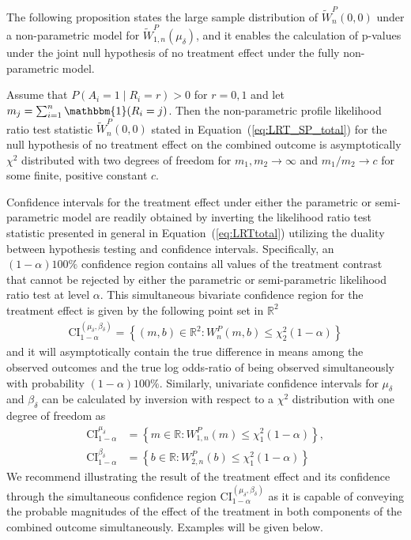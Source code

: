 The following proposition states the large sample distribution of $\widetilde{W}_n^P(0, 0)$ under a non-parametric model for $\widetilde{W}_{1,n}^P(\mu_\delta)$, and it enables the calculation of p-values under the joint null hypothesis of no treatment effect under the fully non-parametric model.

\begin{proposition}
Assume that $P(A_i = 1 \mid R_i = r) > 0$ for $r = 0, 1$ and let $m_j = \sum_{i = 1}^n \mathbbm{1}(R_i = j)$. Then the non-parametric profile likelihood ratio test statistic $\widetilde{W}_n^P(0,0)$ stated in Equation~(\ref{eq:LRT_SP_total}) for the null hypothesis of no treatment effect on the combined outcome is asymptotically $\chi^2$ distributed with two degrees of freedom for $m_1, m_2 \rightarrow \infty$ and $m_1 / m_2 \rightarrow c$ for some finite, positive constant $c$.
\end{proposition}

Confidence intervals for the treatment effect under either the parametric or semi-parametric model are readily obtained by inverting the likelihood ratio test statistic presented in general in Equation~(\ref{eq:LRTtotal}) utilizing the duality between hypothesis testing and confidence intervals. Specifically, an $(1 - \alpha)100\%$ confidence region contains all values of the treatment contrast that cannot be rejected by either the parametric or semi-parametric likelihood ratio test at level $\alpha$. This simultaneous bivariate confidence region for the treatment effect is given by the following point set in $\mathbb{R}^2$
\begin{align*}
  \text{CI}^{(\mu_\delta, \beta_\delta)}_{1 - \alpha} = \left\{(m, b) \in \mathbb{R}^2 : W_n^P(m, b) \leq \chi^2_2(1 - \alpha)\right\}
\end{align*}
and it will asymptotically contain the true difference in means among the observed outcomes and the true log odds-ratio of being observed simultaneously with probability $(1 - \alpha)100\%$. Similarly, univariate confidence intervals for $\mu_\delta$ and $\beta_\delta$ can be calculated by inversion with respect to a $\chi^2$ distribution with one degree of freedom as
\begin{align*}
  \text{CI}^{\mu_\delta}_{1 - \alpha} &= \left\{m \in \mathbb{R} : W_{1,n}^P(m) \leq \chi^2_1(1 - \alpha)\right\},\\
  \text{CI}^{\beta_\delta}_{1 - \alpha} &= \left\{b \in \mathbb{R} : W_{2,n}^P(b) \leq \chi^2_1(1 - \alpha)\right\}
\end{align*}
We recommend illustrating the result of the treatment effect and its confidence through the simultaneous confidence region $\text{CI}^{(\mu_\delta, \beta_\delta)}_{1 - \alpha}$ as it is capable of conveying the probable magnitudes of the effect of the treatment in both components of the combined outcome simultaneously. Examples will be given below.
